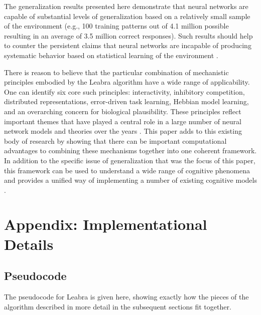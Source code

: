 \documentclass[12pt,twoside]{article}
\begin{document}
The generalization results presented here demonstrate that neural
networks are capable of substantial levels of generalization based on
a relatively small sample of the environment (e.g., 100 training patterns
out of 4.1 million possible resulting in an average of 3.5 million
correct responses).  Such results should help to counter the
persistent claims that neural networks are incapable of producing
systematic behavior based on statistical learning of the environment
\cite[e.g.,]{Marcus98,PinkerPrince88}.

There is reason to believe that the particular combination of
mechanistic principles embodied by the Leabra algorithm have a wide
range of applicability.  One can identify six core such principles:
interactivity, inhibitory competition, distributed representations,
error-driven task learning, Hebbian model learning, and an overarching
concern for biological plausibility.  These principles reflect
important themes that have played a central role in a large number of
neural network models and theories over the years \cite[see][for a
review]{OReilly98}.  This paper adds to this existing body of research
by showing that there can be important computational advantages to
combining these mechanisms together into one coherent framework.  In
addition to the specific issue of generalization that was the focus of
this paper, this framework can be used to understand a wide range of
cognitive phenomena and provides a unified way of implementing a
number of existing cognitive models \cite{OReillyMunakata00}.

\newpage

\appendix

\section{Appendix: Implementational Details}

\subsection{Pseudocode}

The pseudocode for Leabra is given here, showing exactly how the
pieces of the algorithm described in more detail in the subsequent
sections fit together.
\end{document}
